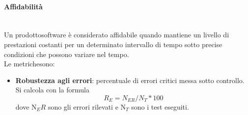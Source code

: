 
	\paragraph{Affidabilità} \mbox{}\\[1mm]
	Un prodotto\glosp software è considerato affidabile quando mantiene un livello di prestazioni costanti per un determinato intervallo di tempo sotto precise condizioni che possono variare nel tempo.\\
	Le metriche\glosp sono:
	\begin{itemize}
		\item \textbf{Robustezza agli errori}: percentuale di errori critici messa sotto controllo. Si calcola con la formula
		\[R_E=N_{ER}/N_{T}*100\]
		dove N$_ER$ sono gli errori rilevati e N$_T$ sono i test eseguiti.
	\end{itemize}
